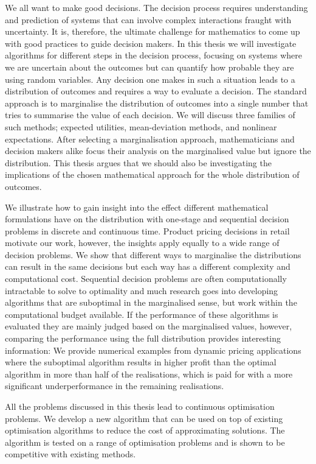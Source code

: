 \documentclass[main.tex]{subfiles}
\begin{document}
We all want to make good decisions. The decision
process requires understanding and prediction of systems that can
involve complex interactions fraught with uncertainty. It is, therefore,
the ultimate challenge for mathematics to come up with good practices
to guide decision makers.  In this thesis we will investigate
algorithms for different steps in the decision process, focusing on
systems where we are uncertain about the outcomes but can quantify how
probable they are using random variables.  Any decision one makes in
such a situation leads to a distribution of outcomes and requires a way
to evaluate a decision.  The standard approach is to
marginalise the distribution of outcomes into a single number that
tries to summarise the value of each decision.  We will discuss three
families of such methods; expected utilities, mean-deviation methods,
and nonlinear expectations. After selecting a marginalisation
approach, mathematicians and decision makers alike
focus their analysis on the marginalised value but ignore the
distribution. This thesis argues that we should also be investigating
the implications of the chosen mathematical approach for the whole
distribution of outcomes.

We illustrate how to gain insight into the effect different mathematical
formulations have on the distribution with one-stage and sequential
decision problems in discrete and continuous time. Product pricing
decisions in retail motivate our work, however, the insights
apply equally to a wide range of decision problems.  We show that
different ways to marginalise the distributions can result in the same
decisions but each way has a different complexity and computational
cost. Sequential decision problems are often computationally
intractable to solve to optimality and much research goes into
developing algorithms that are suboptimal in the marginalised sense,
but work within the computational budget available. If the performance
of these algorithms is evaluated they are mainly judged based on the
marginalised values, however, comparing the performance using the full
distribution provides interesting information: We provide numerical
examples from dynamic pricing applications where the suboptimal
algorithm results in higher profit than the optimal algorithm in more
than half of the realisations, which is paid for with a more significant
underperformance in the remaining realisations.

All the problems discussed in this thesis lead to continuous
optimisation problems. We develop a new algorithm that can be used on
top of existing optimisation algorithms to reduce the cost of
approximating solutions. The algorithm is tested on a range of
optimisation problems and is shown to be competitive with existing
methods.
\thispagestyle{empty}
\end{document}
